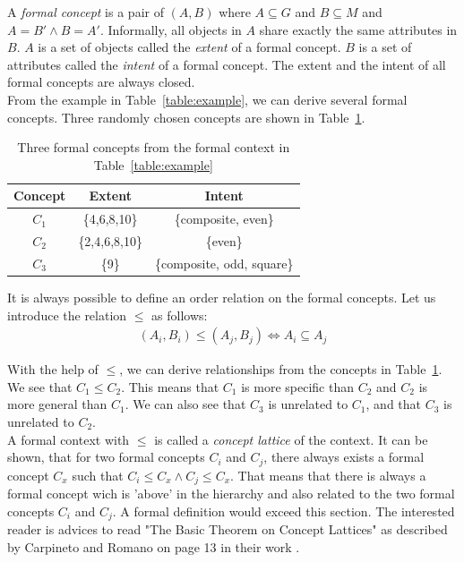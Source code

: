 \documentclass[11pt]{report}
\begin{document}
A \textit{formal concept} is a pair of $(A, B)$ where $A \subseteq G$ and $B \subseteq M$ and $A = B' \wedge B = A' $. Informally, all objects in $A$ share exactly the same attributes in $B$. $A$ is a set of objects called the \textit{extent} of a formal concept. $B$ is a set of attributes called the \textit{intent} of a formal concept. The extent and the intent of all formal concepts are always closed.\\

From the example in Table~\ref{table:example}, we can derive several formal concepts. Three randomly chosen concepts are shown in Table~\ref{table:exampleConcepts}. \\

\begin{table}[h]
\caption{Three formal concepts from the formal context in Table~\ref{table:example}}
\label{table:exampleConcepts}
\centering

\def\arraystretch{1.2}%
\begin{tabular}{ c c c }
\hline
 Concept & Extent & Intent \\
\hline

$C_1$ & \{4,6,8,10\} & \{composite, even\} \\
$C_2$ & \{2,4,6,8,10\} & \{even\} \\
$C_3$ & \{9\} & \{composite, odd, square\} \\

\hline
\end{tabular}
\end{table}

It is always possible to define an order relation on the formal concepts. Let us introduce the relation $\le$ as follows:
\begin{align*} (A_i,B_i) \le (A_j, B_j) \Longleftrightarrow	A_i \subseteq A_j
\end{align*}

With the help of $\le$, we  can derive relationships from the concepts in Table~\ref{table:exampleConcepts}. We see that $C_1 \le C_2$. This means that $C_1$ is more specific than $C_2$ and $C_2$ is more general than $C_1$. We can also see that $C_3$ is unrelated to $C_1$, and that $C_3$ is unrelated to $C_2$. \\

A formal context with $\le$ is called a \textit{concept lattice} of the context. It can be shown, that for two formal concepts $C_i$ and $C_j$, there always exists a formal concept $C_x$ such that $C_i \le C_x \wedge C_j \le C_x$. That means that there is always a formal concept wich is 'above' in the hierarchy and also related to the two formal concepts $C_i$ and $C_j$. A formal definition would exceed this section. The interested reader is advices to read "The Basic Theorem on Concept Lattices" as described by Carpineto and Romano on page 13 in their work \cite{carpineto2004concept}.\\
\end{document}

